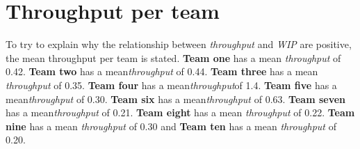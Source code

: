 \documentclass[UKenglish]{ifimaster}  %
\begin{document}
\section{Throughput per team}
To try to explain why the relationship between \textit{throughput} and \textit{WIP} are positive, the mean throughput per team is stated. \textbf{Team one} has a mean \textit{throughput} of 0.42. \textbf{Team two} has a mean\textit{throughput} of 0.44. \textbf{Team three} has a mean \textit{throughput} of 0.35. \textbf{Team four} has a mean\textit{throughput}of 1.4. \textbf{Team five} has a mean\textit{throughput} of 0.30. \textbf{Team six} has a mean\textit{throughput} of 0.63. \textbf{Team seven} has a mean\textit{throughput} of 0.21. \textbf{Team eight} has a mean \textit{throughput} of 0.22. \textbf{Team nine} has a mean \textit{throughput} of 0.30 and \textbf{Team ten} has a mean \textit{throughput} of 0.20.        
\end{document}
